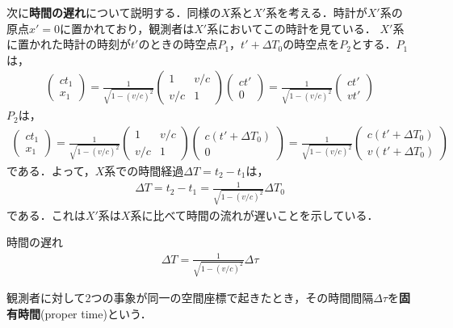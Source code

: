 \documentclass{report}
\begin{document}
  次に\textbf{時間の遅れ}について説明する．同様の$X$系と$X'$系を考える．時計が$X'$系の原点$x'=0$に置かれており，観測者は$X'$系においてこの時計を見ている．
  $X'$系に置かれた時計の時刻が$t'$のときの時空点$P_1$，$t'+\Delta T_0$の時空点を$P_2$とする．$P_1$は，
  \begin{align}
    \begin{pmatrix}
      ct_1 \\ x_1
    \end{pmatrix}
    =
    \frac{1}{\sqrt{1 - (v/c)^2}}
    \begin{pmatrix}
      1 & v/c\\
      v/c & 1
    \end{pmatrix}
    \begin{pmatrix}
      ct'\\0
    \end{pmatrix}
    =
    \frac{1}{\sqrt{1 - (v/c)^2}}
    \begin{pmatrix}
      ct'\\vt'
    \end{pmatrix}
  \end{align}
  $P_2$は，
  \begin{align}
    \begin{pmatrix}
      ct_1 \\ x_1
    \end{pmatrix}
    =
    \frac{1}{\sqrt{1 - (v/c)^2}}
    \begin{pmatrix}
      1 & v/c\\
      v/c & 1
    \end{pmatrix}
    \begin{pmatrix}
      c(t' + \Delta T_0)\\0
    \end{pmatrix}
    =
    \frac{1}{\sqrt{1 - (v/c)^2}}
    \begin{pmatrix}
      c(t' + \Delta T_0)\\v(t' + \Delta T_0)
    \end{pmatrix}
  \end{align}
  である．よって，$X$系での時間経過$\Delta T = t_2 - t_1$は，
  \begin{align}
    \Delta T = t_2 - t_1 = \frac{1}{\sqrt{1 - (v/c)^2}} \Delta T_0
  \end{align}
  である．これは$X'$系は$X$系に比べて時間の流れが遅いことを示している．
  \begin{itembox}[l]{時間の遅れ}
    \begin{align}
      \Delta T = \frac{1}{\sqrt{1 - (v/c)^2}} \Delta \tau
    \end{align}
  \end{itembox}
  観測者に対して2つの事象が同一の空間座標で起きたとき，その時間間隔$\Delta \tau$を\textbf{固有時間}(proper time)という．
\end{document}
